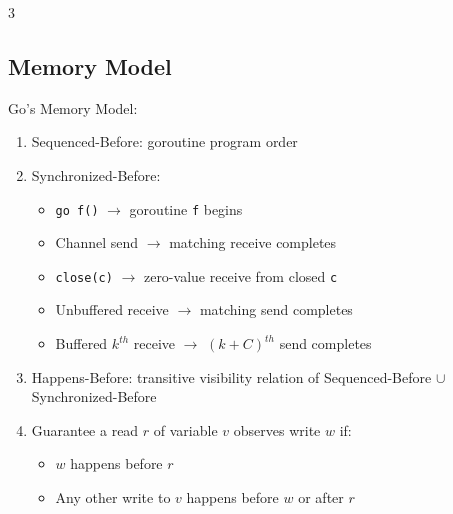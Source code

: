 \documentclass[12pt, a4paper]{article}
\begin{document}
\begin{multicols*}{3}
\subsection{Memory Model}
Go's Memory Model: 
\begin{enumerate}[\roman*.]
  \item Sequenced-Before: goroutine program order
  \item Synchronized-Before:  
    \begin{itemize}[leftmargin=*]\vspace{3pt}
      \item \lstinline|go f()| $\rightarrow$ goroutine \lstinline|f| begins
      \item Channel send $\rightarrow$ matching receive completes
      \item \lstinline|close(c)| $\rightarrow$ zero-value receive from closed \lstinline|c|
      \item Unbuffered receive $\rightarrow$ matching send completes
      \item Buffered $k^{th}$ receive $\rightarrow$ $(k+C)^{th}$ send completes
    \end{itemize}
  \item Happens-Before: transitive visibility relation of Sequenced-Before $\cup$ Synchronized-Before 
  \item Guarantee a read $r$ of variable $v$ observes write $w$ if:
  \begin{itemize}[leftmargin=*]\vspace{3pt}
    \item $w$ happens before $r$
    \item Any other write to $v$ happens before $w$ or after $r$
  \end{itemize}
\end{enumerate}
\vspace{-.5em}

\end{multicols*}
\end{document}
